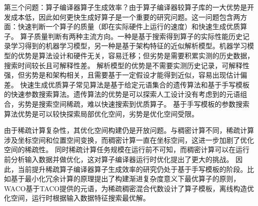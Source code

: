 第三个问题：算子编译器算子生成效率？由于算子编译器较算子库的一大优势是开发成本低，因此如何更快生成好算子是一个重要的研究问题。这一问题包含两方面：快速判断一个算子的质量（即在实际硬件上运行的速度）和快速生成优质算子。
算子质量判断有两种主流方向。一种是基于搜索得到算子的实际性能历史记录学习得到的机器学习模型，另一种是基于架构特征的近似解析模型。机器学习模型的优势是算法设计和硬件无关，容易迁移；但劣势是需要积累实测的历史数据，搜索时间较长且可解释性差\cite{AutoTVM,Ansor,AMOS}。
解析模型的优势是不需要实测历史记录，可解释性强，但劣势是和架构相关，且需要基于一定假设才能得到近似，容易出现估计偏差\cite{GNNAdvisor,Roller,ALCOP}。
快速生成优质算子常见算法是基于给定元语集合的遗传算法和基于手写模板的快速参数搜索算法。遗传算法的优势是可以探索人工设计没有考虑到的元语组合，劣势是搜索空间稀疏，难以快速搜索到优质算子\cite{Hidet}。
基于手写模板的参数搜索算法优势是可以较快探索局部优化空间，劣势是优化空间受限\cite{Auto-Halide}。

由于稀疏计算复杂性，其优化空间构建仍是开放问题。与稠密计算不同，稀疏计算涉及坐标空间和位置空间变换，而稠密计算一直在坐标空间，这进一步加剧了优化空间的稀疏性\cite{senanayake:2020:scheduling}。
同时稀疏计算任务规模在运行前不可知，而稠密计算可以在运行前分析输入数据并做优化，这对算子编译器运行时优化提出了更大的挑战\cite{Dynamic-tiling}。
因此，当前提升稀疏算子编译器算子生成效率的研究仍处于基于手写模板的阶段。比如\cite{ahrens:2022:autoscheduling}基于最小化冗余计算的原理提出了构建渐进复杂度意义下最优算子的原则，
WACO\cite{WACO}基于TACO\cite{kjolstad:2017:taco}提供的元语，为稀疏稠密混合代数设计了算子模板，离线构造优化空间，运行时根据输入数据特征搜索最优解。